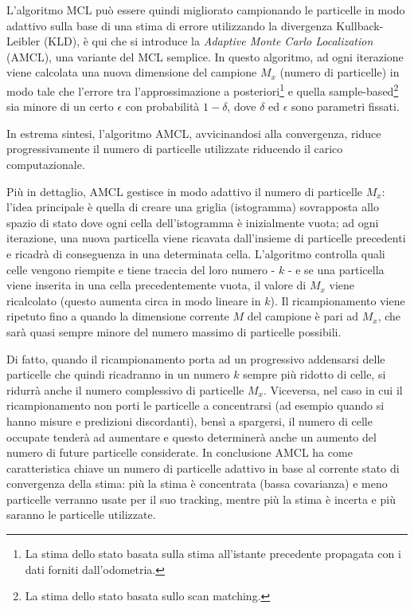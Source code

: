 \bigskip

L’algoritmo MCL può essere quindi migliorato campionando le particelle in modo adattivo sulla base di una stima di errore utilizzando la divergenza Kullback-Leibler (KLD), è qui che si introduce la \textit{Adaptive Monte Carlo Localization} (AMCL), una variante del MCL semplice. In questo algoritmo, ad ogni iterazione viene calcolata una nuova dimensione del campione $M_x$ (numero di particelle) in modo tale che l’errore tra l’approssimazione a posteriori\footnote{La stima dello stato basata sulla stima all'istante precedente propagata con i dati forniti dall'odometria.} e quella sample-based\footnote{La stima dello stato basata sullo scan matching.} sia minore di un certo $\epsilon$ con probabilità $1-\delta$, dove $\delta$ ed $\epsilon$ sono parametri fissati.

In estrema sintesi, l'algoritmo AMCL, avvicinandosi alla convergenza, riduce progressivamente il numero di particelle utilizzate riducendo il carico computazionale.

 \bigskip
 
Più in dettaglio, AMCL gestisce in modo adattivo il numero di particelle $M_x$: l’idea principale è quella di creare una griglia (istogramma) sovrapposta allo spazio di stato dove ogni cella dell'istogramma è inizialmente vuota; ad ogni iterazione, una nuova particella viene ricavata dall'insieme di particelle precedenti e ricadrà di conseguenza in una determinata cella. L'algoritmo controlla quali celle vengono riempite e tiene traccia del loro numero - $k$ - e se una particella viene inserita in una cella precedentemente vuota, il valore di $M_x$ viene ricalcolato (questo aumenta circa in modo lineare in $k$). Il ricampionamento viene ripetuto fino a quando la dimensione corrente $M$ del campione è pari ad $M_x$, che sarà quasi sempre minore del numero massimo di particelle possibili.

\bigskip

Di fatto, quando il ricampionamento porta ad un progressivo addensarsi delle particelle che quindi ricadranno in un numero $k$ sempre più ridotto di celle, si ridurrà anche il numero complessivo di particelle $M_x$. Viceversa, nel caso in cui il ricampionamento non porti le particelle a concentrarsi (ad esempio quando si hanno misure e predizioni discordanti), bensì a spargersi, il numero di celle occupate tenderà ad aumentare e questo determinerà anche un aumento del numero di future particelle considerate. In conclusione AMCL ha come caratteristica chiave un numero di particelle adattivo in base al corrente stato di convergenza della stima: più la stima è concentrata (bassa covarianza) e meno particelle verranno usate per il suo tracking, mentre più la stima è incerta e più saranno le particelle utilizzate.
